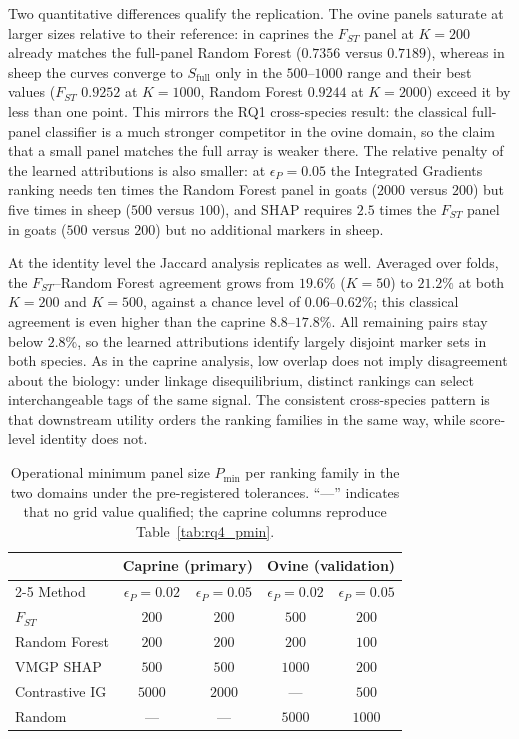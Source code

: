 Two quantitative differences qualify the replication. The ovine
panels saturate at larger sizes relative to their reference: in
caprines the $F_{ST}$ panel at $K=200$ already matches the full-panel
Random Forest ($0.7356$ versus $0.7189$), whereas in sheep the curves
converge to $S_{\mathrm{full}}$ only in the $500$--$1000$ range and
their best values ($F_{ST}$ $0.9252$ at $K=1000$, Random Forest
$0.9244$ at $K=2000$) exceed it by less than one point. This mirrors
the RQ1 cross-species result: the classical full-panel classifier is a
much stronger competitor in the ovine domain, so the claim that a small
panel matches the full array is weaker there. The relative penalty of
the learned attributions is also smaller: at $\epsilon_P=0.05$ the
Integrated Gradients ranking needs ten times the Random Forest panel in
goats ($2000$ versus $200$) but five times in sheep ($500$ versus
$100$), and SHAP requires $2.5$ times the $F_{ST}$ panel in goats
($500$ versus $200$) but no additional markers in sheep.

At the identity level the Jaccard analysis replicates as well. Averaged
over folds, the $F_{ST}$--Random Forest agreement grows from $19.6\%$
($K=50$) to $21.2\%$ at both $K=200$ and $K=500$, against a chance
level of $0.06$--$0.62\%$; this classical agreement is even higher than
the caprine $8.8$--$17.8\%$. All remaining pairs stay below $2.8\%$, so
the learned attributions identify largely disjoint marker sets in both
species. As in the caprine analysis, low overlap does not imply
disagreement about the biology: under linkage disequilibrium, distinct
rankings can select interchangeable tags of the same signal. The
consistent cross-species pattern is that downstream utility orders the
ranking families in the same way, while
score-level identity does not.

\begin{table}[ht]
\centering
\caption{Operational minimum panel size $P_{\min}$ per ranking family
in the two domains under the pre-registered tolerances. ``---''
indicates that no grid value qualified; the caprine columns reproduce
Table~\ref{tab:rq4_pmin}.}
\label{tab:cross_species_pmin}
\begin{tabular}{lcccc}
\hline
 & \multicolumn{2}{c}{Caprine (primary)} & \multicolumn{2}{c}{Ovine (validation)} \\
\cline{2-5}
Method & $\epsilon_P=0.02$ & $\epsilon_P=0.05$ & $\epsilon_P=0.02$ & $\epsilon_P=0.05$ \\
\hline
$F_{ST}$ & $200$ & $200$ & $500$ & $200$ \\
Random Forest & $200$ & $200$ & $200$ & $100$ \\
VMGP SHAP & $500$ & $500$ & $1000$ & $200$ \\
Contrastive IG & $5000$ & $2000$ & --- & $500$ \\
Random & --- & --- & $5000$ & $1000$ \\
\hline
\end{tabular}
\end{table}

